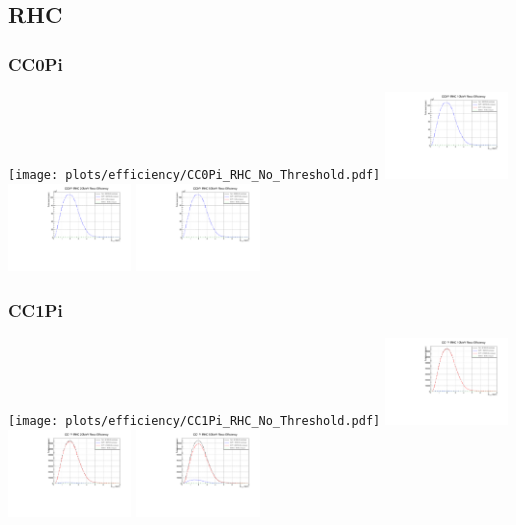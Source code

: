 \subsection{RHC}

\subsubsection{CC0Pi}

\begin{center}

\texttt{[image: plots/efficiency/CC0Pi\_RHC\_No\_Threshold.pdf]}
\includegraphics[width=0.245\textwidth]{plots/efficiency/CC0Pi_RHC_10MeV.pdf} 
\includegraphics[width=0.245\textwidth]{plots/efficiency/CC0Pi_RHC_20MeV.pdf}
\includegraphics[width=0.245\textwidth]{plots/efficiency/CC0Pi_RHC_50MeV.pdf}

\end{center}

\subsubsection{CC1Pi}

\begin{center}

\texttt{[image: plots/efficiency/CC1Pi\_RHC\_No\_Threshold.pdf]}
\includegraphics[width=0.245\textwidth]{plots/efficiency/CC1Pi_RHC_10MeV.pdf} 
\includegraphics[width=0.245\textwidth]{plots/efficiency/CC1Pi_RHC_20MeV.pdf}
\includegraphics[width=0.245\textwidth]{plots/efficiency/CC1Pi_RHC_50MeV.pdf}

\end{center}

